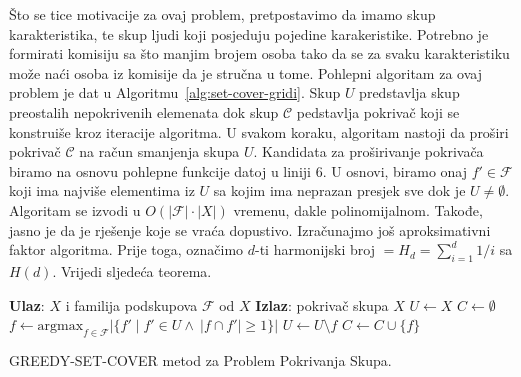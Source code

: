 \documentclass[a4paper, utf8, 11pt, colorlinks]{book}
\begin{document}
Što se tice motivacije za ovaj problem, pretpostavimo da imamo skup karakteristika, te skup ljudi koji posjeduju pojedine karakeristike. Potrebno je formirati komisiju sa što manjim brojem osoba tako da se za svaku karakteristiku može naći osoba iz komisije da je stručna u tome. Pohlepni algoritam za ovaj problem je dat u Algoritmu~\ref{alg:set-cover-gridi}.  %
Skup $U$ predstavlja skup preostalih nepokrivenih elemenata dok skup $\mathcal{C}$ pedstavlja pokrivač koji se konstruiše kroz iteracije algoritma. U svakom koraku, algoritam nastoji da proširi pokrivač $\mathcal{C}$ na račun smanjenja skupa $U$. Kandidata za proširivanje pokrivača biramo na osnovu pohlepne funkcije datoj u liniji 6. U osnovi, biramo onaj $f' \in \mathcal{F}$ koji ima najviše  elementima iz $U$ sa kojim ima neprazan presjek sve dok je $U \neq \emptyset$. Algoritam se izvodi u $O(|\mathcal{F}| \cdot |X|)$ vremenu, dakle  polinomijalnom. Takođe, jasno je da je rješenje koje se vraća dopustivo. Izračunajmo još aproksimativni faktor algoritma. Prije toga, označimo $d$-ti harmonijski broj $=H_d = \sum_{i=1}^d 1/i$ sa $H(d)$. 
Vrijedi sljedeća teorema.

\begin{algorithm}[!t] 
	\begin{algorithmic}[1]
		\STATE \textbf{Ulaz}: $X$ i familija podskupova $\mathcal{F}$ od $X$
		\STATE \textbf{Izlaz}: pokrivač skupa $X$
		\STATE $U \gets X$
		\STATE $C \gets \emptyset$
		\STATE $f \gets \mbox{argmax}_{f \in \mathcal{F}} |\{ f' \mid f' \in U  \wedge\ |f \cap f'| \geq 1\}| $
		\STATE $U \gets U \setminus f$
		\STATE $C \gets C \cup \{f\}$
		\ENDWHILE
	\end{algorithmic}
	\caption{GREEDY-SET-COVER metod za Problem Pokrivanja Skupa.}
    \label{alg:set-cover-gridi}
\end{algorithm}
\end{document}
